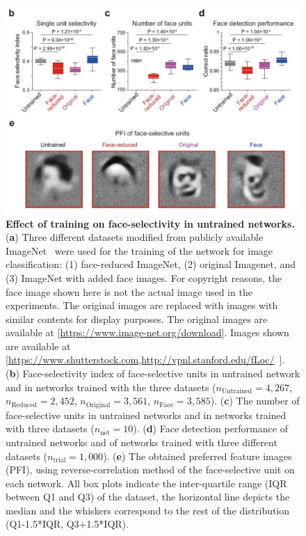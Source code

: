 \documentclass[final,3p,times,twocolumn]{elsarticle}
\begin{document}
\begin{figure}[htbp]
	\centering
	
	\subfigure%
	{
		\begin{minipage}[t]{1.0\linewidth}
			\centering
			\includegraphics[width=1.0\textwidth]{figs/fig_4_b_f.pdf}
		\end{minipage}%
	}%
	
	
	\centering
	\caption{
		\textbf{Effect of training on face-selectivity in untrained networks.
		}
	(\textbf{a}) Three different datasets modified from publicly available ImageNet~\cite{ILSVRC15} were used for the training of the network for image classification: 
	(1) face-reduced ImageNet, 
	(2) original Imagenet, 
	and (3) ImageNet with added face images.
	For copyright reasons, the face image shown here is not the actual image used in the experiments.
	The original images are replaced with images with similar contents for display purposes.
	The original images are available at [\url{https://www.image-net.org/download}].
	Images shown are available at [\url{https://www.shutterstock.com},\url{http://vpnl.stanford.edu/fLoc/}~\cite{stigliani2015temporal}].
	(\textbf{b}) Face-selectivity index of face-selective units in untrained network and in networks trained with the three datasets ($ n_\textrm{Untrained} = 4,267 $, $ n_\textrm{Reduced} = 2,452 $, $ n_\textrm{Original} = 3,561 $, $ n_\textrm{Face} = 3,585 $).
	(\textbf{c}) The number of face-selective units in untrained networks and in networks trained with three datasets ($ n_\text{net} = 10 $).
	(\textbf{d}) Face detection performance of untrained networks and of networks trained with three different datasets ($ n_\textrm{trial} = 1,000 $).
	(\textbf{e}) The obtained preferred feature images (PFI), using reverse-correlation method of the face-selective unit on each network.
	All box plots indicate the inter-quartile range (IQR between Q1 and Q3) of the dataset,
	the horizontal line depicts the median and the whiskers correspond to the rest of the distribution (Q1-1.5*IQR, Q3+1.5*IQR).
	}
	\label{fig:effect}
\end{figure}
\end{document}
